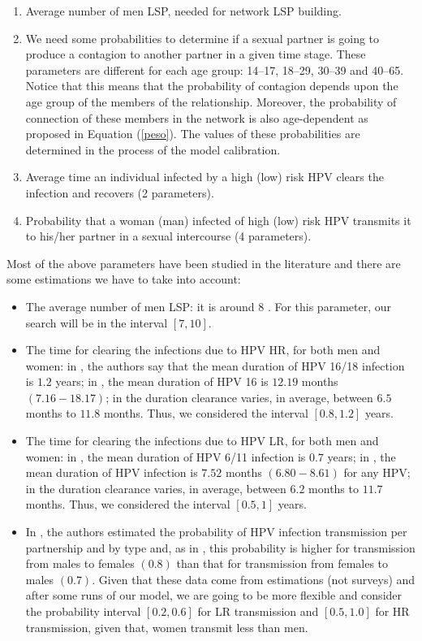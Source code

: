 \begin{enumerate}
	\item Average number of men LSP, needed for network LSP building.
	\item We need some probabilities to determine if a sexual partner is going to produce a contagion to another partner in a given time stage. These parameters are different for each age group:	
	14--17, 18--29, 30--39 and 40--65. Notice that this means that the probability of contagion depends upon the age group of the members of the relationship. Moreover, the probability of connection of these members in the network is also age-dependent as proposed in Equation (\ref{peso}). The values of these probabilities are determined in the process of the model calibration.\label{las_T}
	\item Average time an individual infected by a high (low) risk HPV clears the infection and recovers (2 parameters).
	\item Probability that a woman (man) infected of high (low) risk HPV transmits it to his/her partner in a sexual intercourse (4 parameters). 
\end{enumerate}

Most of the above parameters have been studied in the literature and there are some estimations we have to take into account:
\begin{itemize}
	\item The average number of men LSP: it is around $8$ \cite{Durex2002}. For this parameter, our search will be in the interval $[7, 10]$.

	\item The time for clearing the infections due to HPV HR, for both men and women: in \cite{elbasha2007model}, the authors say that the mean duration of HPV 16/18 infection is $1.2$ years; in \cite{Giuliano2011}, the mean duration of HPV 16 is $12.19$  months $(7.16-18.17)$; in \cite{Nyitray2015} the duration clearance varies, in average, between $6.5$ months to $11.8$ months. Thus, we considered the interval $[0.8, 1.2]$ years.
	
	\item The time for clearing the infections due to HPV LR, for both men and women: in \cite{elbasha2007model}, the mean duration of HPV 6/11 infection is $0.7$ years; in \cite{Giuliano2011}, the mean duration of HPV infection is $7.52$ months $(6.80-8.61)$ for any HPV;  in \cite{Nyitray2015} the duration clearance varies, in average, between $6.2$ months to $11.7$ months. Thus, we considered the interval $[0.5, 1]$ years.
	
	\item In \cite{elbasha2007model}, the authors estimated the probability of HPV infection transmission per partnership and by type and, as in \cite{castellsague2012prevalence}, this probability is higher for transmission from males to females $(0.8)$ than that for transmission from females to males $(0.7)$. Given that these data come from estimations (not surveys) and after some runs of our model, we are going to be more flexible and consider the probability interval $[0.2,0.6]$ for LR transmission and $[0.5,1.0]$ for HR transmission, given that, women transmit less than men.
\end{itemize}


